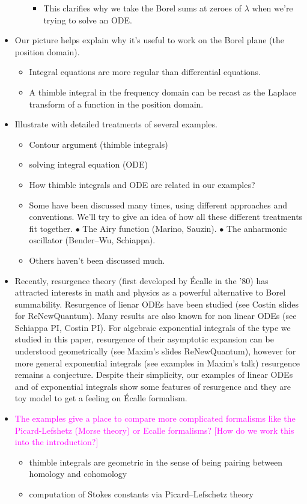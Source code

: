 \documentclass{article}
\begin{document}
\begin{itemize}
\begin{itemize}
\begin{itemize}
\item This clarifies why we take the Borel sums at zeroes of $\lambda$ when we're trying to solve an ODE.
\end{itemize}
\end{itemize}
\item Our picture helps explain why it's useful to work on the Borel plane (the position domain).
\begin{itemize}
\item Integral equations are more regular than differential equations.
\item A thimble integral in the frequency domain can be recast as the Laplace transform of a function in the position domain.
\end{itemize}
\item Illustrate with detailed treatments of several examples.
\begin{itemize}
\item Contour argument (thimble integrals)
\item solving integral equation (ODE)
\item How thimble integrals and ODE are related in our examples?
\end{itemize}
\begin{itemize}
\item Some have been discussed many times, using different approaches and conventions. We'll try to give an idea of how all these different treatments fit together. $\bullet$ The Airy function (Marino, Sauzin). $\bullet$ The anharmonic oscillator (Bender--Wu, Schiappa).
\item Others haven't been discussed much.
\end{itemize}
\item Recently, resurgence theory (first developed by \'Ecalle in the '80) has attracted interests in math and physics as a powerful alternative to Borel summability. Resurgence of lienar ODEs have been studied (see Costin slides for ReNewQuantum). Many results are also known for non linear ODEs (see Schiappa PI, Costin PI). For algebraic exponential integrals of the type we studied in this paper, resurgence of their asymptotic expansion can be understood geometrically (see Maxim's slides ReNewQuantum), however for more general exponential integrals (see examples in Maxim's talk) resurgence remains a conjecture. Despite their simplicity, our examples of linear ODEs and of exponential integrals show some features of resurgence and they are toy model to get a feeling on \'Ecalle formalism.       
\item \textcolor{magenta}{The examples give a place to compare more complicated formalisms like the Picard-Lefshetz (Morse theory) or Ecalle formalisms? [How do we work this into the introduction?]}
\begin{itemize}
\item thimble integrals are geometric in the sense of being pairing between homology and cohomology 
\item computation of Stokes constants via Picard--Lefschetz theory
\end{itemize}
\end{itemize}
\end{document}
